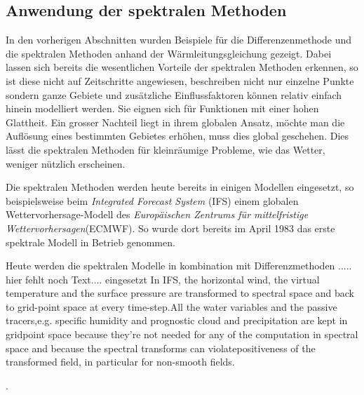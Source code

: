 \begin{refsection}
\subsection{Anwendung der spektralen Methoden}
In den vorherigen Abschnitten wurden Beispiele für die Differenzenmethode und die spektralen Methoden anhand der Wärmleitungsgleichung gezeigt. Dabei lassen sich bereits die wesentlichen Vorteile der spektralen Methoden erkennen, so ist diese nicht auf Zeitschritte angewiesen, beschreiben nicht nur einzelne Punkte sondern ganze Gebiete und zusätzliche Einflussfaktoren können relativ einfach hinein modelliert werden. Sie eignen sich für Funktionen mit einer hohen Glattheit. Ein grosser Nachteil liegt in ihrem globalen Ansatz, möchte man die Auflösung eines bestimmten Gebietes erhöhen, muss dies global geschehen. Dies lässt die spektralen Methoden für kleinräumige Probleme, wie das Wetter, weniger nützlich erscheinen.
 
Die spektralen Methoden werden heute bereits in einigen Modellen eingesetzt, so beispielsweise beim {\em Integrated Forecast System} (IFS) einem globalen Wettervorhersage-Modell des {\em Europäischen Zentrums für mittelfristige Wettervorhersagen}(ECMWF). So wurde dort bereits im April 1983 das erste spektrale Modell in Betrieb genommen.

Heute werden die spektralen Modelle in kombination mit Differenzmethoden ..... hier fehlt noch  Text.... eingesetzt
In IFS, the horizontal wind, the virtual temperature and the surface pressure are transformed to spectral space and back to grid-point space at every time-step.All the water variables and the passive tracers,e.g. specific humidity and prognostic cloud and precipitation are kept in gridpoint space because they’re not needed for any of the computation in spectral space and because the spectral transforms can violatepositiveness of the transformed field, in particular for non-smooth fields.


\cite{klima:ecmwf}.


\printbibliography[heading=subbibliography]
\end{refsection}